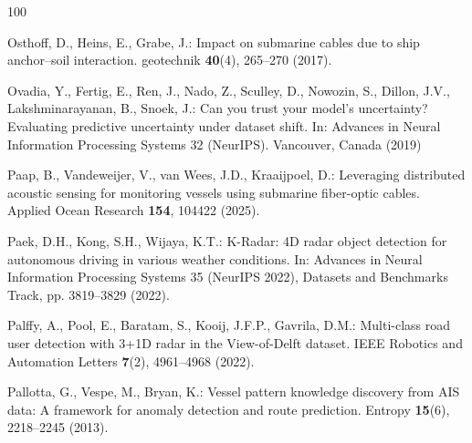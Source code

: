 \documentclass[graybox,envcountchap]{style/SNmono}
\begin{document}
\begin{thebibliography}{100}
{\par}

Osthoff, D., Heins, E., Grabe, J.: Impact on submarine cables due to ship
  anchor--soil interaction.
\newblock geotechnik \textbf{40}(4), 265--270 (2017).
\newblock {}


{\color{red} 
Ovadia, Y., Fertig, E., Ren, J., Nado, Z., Sculley, D., Nowozin, S., Dillon,
  J.V., Lakshminarayanan, B., Snoek, J.: Can you trust your model's
  uncertainty? {E}valuating predictive uncertainty under dataset shift.
\newblock In: Advances in Neural Information Processing Systems 32 (NeurIPS).
  Vancouver, Canada (2019)

\par}

Paap, B., Vandeweijer, V., van Wees, J.D., Kraaijpoel, D.: Leveraging
  distributed acoustic sensing for monitoring vessels using submarine
  fiber-optic cables.
\newblock Applied Ocean Research \textbf{154}, 104422 (2025).
\newblock {}



Paek, D.H., Kong, S.H., Wijaya, K.T.: {K-Radar}: {4D} radar object detection
  for autonomous driving in various weather conditions.
\newblock In: Advances in Neural Information Processing Systems 35 (NeurIPS
  2022), Datasets and Benchmarks Track, pp. 3819--3829 (2022).
\newblock {}



Palffy, A., Pool, E., Baratam, S., Kooij, J.F.P., Gavrila, D.M.: Multi-class
  road user detection with {3+1D} radar in the {View-of-Delft} dataset.
\newblock IEEE Robotics and Automation Letters \textbf{7}(2), 4961--4968
  (2022).
\newblock {}



Pallotta, G., Vespe, M., Bryan, K.: Vessel pattern knowledge discovery from
  {AIS} data: A framework for anomaly detection and route prediction.
\newblock Entropy \textbf{15}(6), 2218--2245 (2013).
\newblock {}



\end{thebibliography}
\end{document}
